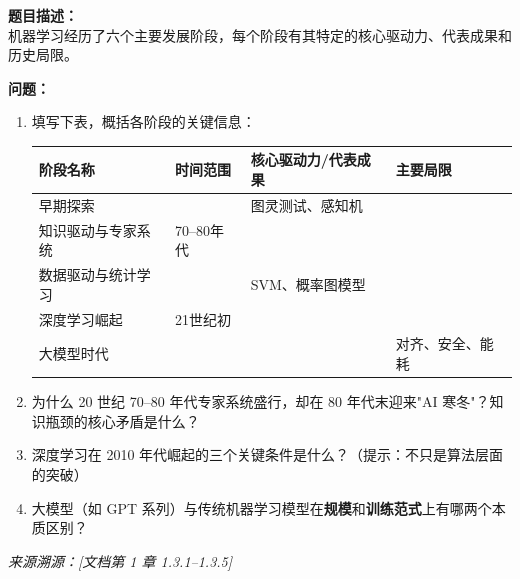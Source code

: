 \documentclass[a4paper,11pt]{ctexart}
\begin{document}
\begin{problembox}
    \textbf{题目描述：}\\
    机器学习经历了六个主要发展阶段，每个阶段有其特定的核心驱动力、代表成果和历史局限。

    \vspace{0.3cm}
    \textbf{问题：}
    \begin{enumerate}[(1)]
        \item 填写下表，概括各阶段的关键信息：
        \begin{center}
        \begin{tabular}{p{3.5cm} p{2.5cm} p{3.5cm} p{3cm}}
            \toprule
            阶段名称 & 时间范围 & 核心驱动力/代表成果 & 主要局限 \\
            \midrule
            早期探索 & \underline{\hspace{1.5cm}} & 图灵测试、感知机 & \underline{\hspace{2cm}} \\[1.2em]
            知识驱动与专家系统 & 70--80年代 & \underline{\hspace{3cm}} & \underline{\hspace{2cm}} \\[1.2em]
            数据驱动与统计学习 & \underline{\hspace{1.5cm}} & SVM、概率图模型 & \underline{\hspace{2cm}} \\[1.2em]
            深度学习崛起 & 21世纪初 & \underline{\hspace{3cm}} & \underline{\hspace{2cm}} \\[1.2em]
            大模型时代 & \underline{\hspace{1.5cm}} & \underline{\hspace{3cm}} & 对齐、安全、能耗 \\
            \bottomrule
        \end{tabular}
        \end{center}
        \item 为什么 20 世纪 70--80 年代专家系统盛行，却在 80 年代末迎来"AI 寒冬"？知识瓶颈的核心矛盾是什么？
        \item 深度学习在 2010 年代崛起的三个关键条件是什么？（提示：不只是算法层面的突破）
        \item 大模型（如 GPT 系列）与传统机器学习模型在\textbf{规模}和\textbf{训练范式}上有哪两个本质区别？
    \end{enumerate}
    {\color{gray}\small\textit{来源溯源：[文档第 1 章 1.3.1--1.3.5]}}
\end{problembox}
\end{document}
